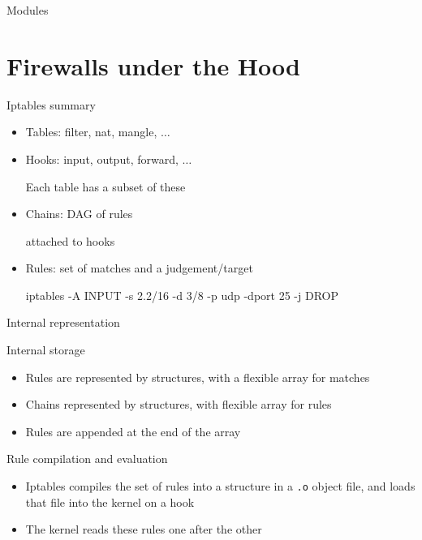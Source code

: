 \begin{reveals}
\begin{frame}[c]{Modules}
\end{frame}

\section{Firewalls under the Hood}


\begin{frame}[c]{Iptables summary}

  \begin{itemize}
  \item Tables: filter, nat, mangle, \(\ldots\)
  \item Hooks: input, output, forward, \(\ldots\)
    \begin{center}
      \color{red}Each table has a subset of these
    \end{center}
  \item Chains: DAG of rules 
    \begin{center}
      \color{red}attached to hooks
    \end{center}
  \item Rules: set of matches and a judgement/target
    \begin{center}
      \color{red}iptables -A INPUT -s 2.2/16 -d 3/8 -p udp -dport 25 -j DROP
    \end{center}
  \end{itemize}
  
\end{frame}

\begin{frame}[c]{Internal representation}
  
  \begin{block}{Internal storage}
    \begin{itemize}
    \item Rules are represented by structures, with a flexible array for
      matches
    \item Chains represented by structures, with flexible array for rules
    \item Rules are appended at the end of the array
    \end{itemize}
  \end{block}

  \vfill
  \begin{block}{Rule compilation and evaluation}
    \begin{itemize}
    \item Iptables compiles the set of rules into a structure in a
      \texttt{.o} object file, and loads that file into the kernel on a hook
    \item The kernel reads these rules one after the other
    \end{itemize}
  \end{block}


\end{frame}
\end{reveals}
